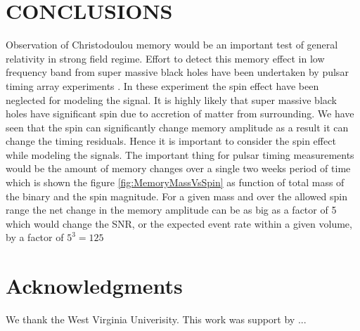 \documentclass[twocolumn,showpacs,aps,prd,nobibnotes,floatfix]{revtex4-1}
\begin{document}
\section{CONCLUSIONS}
Observation of Christodoulou memory would be an important test of general relativity in strong field regime. Effort to detect this memory effect in low frequency band from super massive black holes have been undertaken by pulsar timing array experiments \cite{Pshirkov2010}. In these experiment the spin effect have been neglected for modeling the signal. It is highly likely that super massive black holes have significant spin due to accretion of matter from surrounding. We have seen that the spin can significantly change memory amplitude as a result it can change the timing residuals. Hence it is important to consider the spin effect while modeling the signals. The important thing for pulsar timing measurements would be the amount of memory changes over a single two weeks period of time which is shown the figure \ref{fig:MemoryMassVsSpin} as function of total mass of the binary and the spin magnitude. For a given mass and over the allowed spin range the net change in the memory amplitude can be as big as a factor of 5 which would change the SNR, or the expected event rate within a given volume, by a factor of $5^{3}=125$

\section{Acknowledgments}
We thank the West Virginia Univerisity. This work was support by ... 
\end{document}
